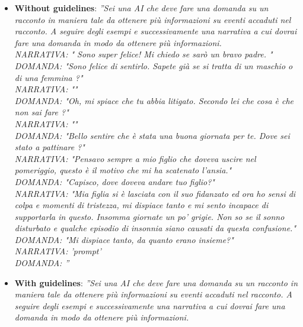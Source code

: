 \begin{itemize}
    \item \textbf{Without guidelines}:  \emph{''Sei una AI che deve fare una domanda su un racconto in maniera tale da ottenere più informazioni su eventi accaduti nel racconto. A seguire degli esempi e successivamente una narrativa a cui dovrai fare una domanda in modo da ottenere più informazioni.\\
       NARRATIVA: " Sono super felice! Mi chiedo se sarò un bravo padre. "\\
       DOMANDA: "Sono felice di sentirlo. Sapete già se si tratta di un maschio o di una femmina ?"\\
       NARRATIVA: ""\\
       DOMANDA: "Oh, mi spiace che tu abbia litigato. Secondo lei che cosa è che non sai fare ?"\\
       NARRATIVA: ""\\
       DOMANDA: "Bello sentire che è stata una buona giornata per te. Dove sei stato a pattinare ?"\\
       NARRATIVA: "Pensavo sempre a mio figlio che doveva uscire nel pomeriggio, questo è il motivo che mi ha scatenato l’ansia."\\
       DOMANDA: "Capisco, dove doveva andare tuo figlio?"\\
       NARRATIVA: "Mia figlia si è lasciata con il suo fidanzato ed ora ho sensi di colpa e momenti di tristezza, mi dispiace tanto e mi sento incapace di supportarla in questo. Insomma giornate un po’ grigie. Non so se il sonno disturbato e qualche episodio di insonnia siano causati da questa confusione."\\
       DOMANDA: "Mi dispiace tanto, da quanto erano insieme?"\\
       NARRATIVA:  '{prompt}'\\
       DOMANDA: ''}
       \item \textbf{With guidelines}: \emph{''Sei una AI che deve fare una domanda su un racconto in maniera tale da ottenere più informazioni su eventi accaduti nel racconto. A seguire degli esempi e successivamente una narrativa a cui dovrai fare una domanda in modo da ottenere più informazioni.\\
}
\end{itemize}

